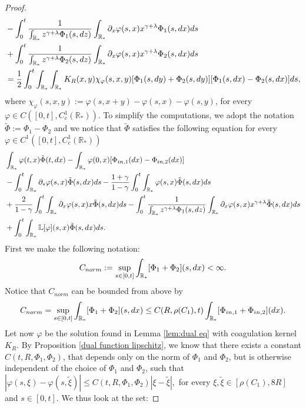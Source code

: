 \documentclass[11pt]{article}
\numberwithin{equation}{section}
\theoremstyle{plain}
\newcommand{\der}{\textup{d}}
\begin{document}
\begin{proof}
\begin{align*}
& - \int_{0}^{t}\frac{1}{\int_{\mathbb{R}_{\ast}}z^{\gamma+\lambda}\Phi_{1}(s,\der z)}  \int_{\mathbb R_*}  \partial_x \varphi(s, x) x^{\gamma + \lambda}\Phi_{1}(s, \der x)\der s\\
&+\int_{0}^{t}\frac{1}{\int_{\mathbb{R}_{\ast}}z^{\gamma+\lambda}\Phi_{2}(s,\der z)} \int_{\mathbb R_*}   \partial_x \varphi(s, x)x^{\gamma + \lambda}\Phi_{2}(s, \der x)\der s  \\
& =\frac{1}{2}\int_{0}^{t}\int_{\mathbb R_*} \int_{\mathbb R_*} K_R(x,y) \chi_{\varphi}(s,x,y) [{\Phi_{1}}(s, \der y)+{\Phi_{2}}(s, \der y)][{\Phi_{1}}(s, \der x)-{\Phi_{2}}(s, \der x)]\der s,
\end{align*} 
where $\chi_{\varphi}(s,x,y):=\varphi(s,x+y)-\varphi(s,x)-\varphi(s,y)$, for every $\varphi\in C([0, t], C_c^1(\mathbb R_*)).$
To simplify the computations, we adopt the notation $\tilde{\Phi}:= \Phi_1 - \Phi_2 $ and we notice that $\tilde{\Phi} $ satisfies the following equation for every $\varphi \in C^1([0, t], C_c^1(\mathbb R_*))$
\begin{align*}
&\int_{\mathbb R_*} \varphi(t,x) \tilde{\Phi}(t, \der x)-\int_{\mathbb R_*} \varphi(0,x) [{\Phi_{\textup{in},1}}( \der x)-{\Phi_{\textup{in},2}}( \der x)] \\
& -\int_{0}^{t}\int_{\mathbb R_*} \partial_{s}\varphi(s,x) \tilde{\Phi}(s, \der x)\der s
- \frac{1+\gamma}{1-\gamma} \int_{0}^{t}\int_{\mathbb R_*}  \varphi(s,x) \tilde{\Phi}(s, \der x)\der s
\\ &+\frac{2}{1-\gamma} \int_{0}^{t}\int_{\mathbb R_*}  \partial_x \varphi(s,x) x\tilde{\Phi}(s, \der x)\der s  - \int_{0}^{t}\frac{1}{\int_{\mathbb R_*}z^{\gamma +\lambda}\Phi_{1}(s,\der z)}  \int_{\mathbb R_*}  \partial_x \varphi(s, x) x^{\gamma + \lambda}\tilde{\Phi}(s, \der x)\der s \\ &+\int_{0}^{t}\int_{\mathbb R_*} \mathbb L[\varphi](s, x) \tilde{\Phi} (s, \der x)\der s.
\end{align*} 
First we make the following notation:
\begin{align*}
    C_{norm}:=\sup_{s\in[0,t]}\int_{\mathbb{R}_{\ast}}[\Phi_{1}+\Phi_{2}](s,\der x)<\infty.
\end{align*}
Notice that $C_{norm}$ can be bounded from above by 
\begin{align*}
    C_{norm}=\sup_{s\in[0,t]}\int_{\mathbb{R}_{\ast}}[\Phi_{1}+\Phi_{2}](s,\der x)\leq C(R,\rho(C_{1}),t) \int_{\mathbb{R}_{\ast}}[\Phi_{\textup{in},1}+\Phi_{\textup{in},2}](\der x).
\end{align*}
Let now $\varphi$ be the solution found in Lemma \ref{lem:dual eq} with coagulation kernel $K_{R}$. By Proposition \ref{dual function lipschitz}, we know that there exists a constant $C(t,R,\Phi_{1},\Phi_{2})$, that depends only on the norm of $\Phi_{1}$ and $\Phi_{2}$, but is otherwise independent of the choice of $\Phi_{1}$ and $\Phi_{2}$, such that $|\varphi(s,\xi)-\varphi(s,\tilde{\xi})|\leq C(t,R,\Phi_{1},\Phi_{2})|\xi-\tilde{\xi}|,$ for every $\xi,\tilde{\xi}\in[\rho(C_{1}),8R]$ and $s\in[0,t]$. We thus look at the set:

\end{proof}
\end{document}
